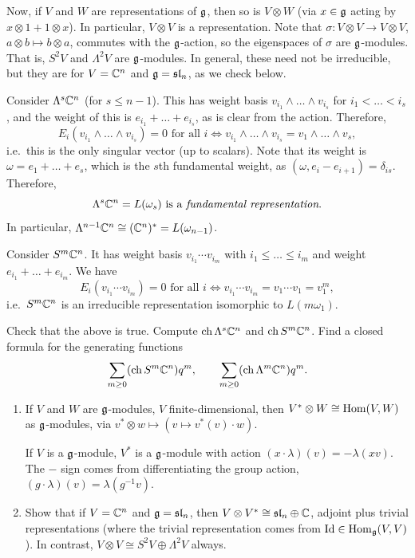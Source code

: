 Now, if $V$ and $W$ are representations of $\mathfrak{g}$, then so is $V \otimes W$ (via
$x \in \mathfrak{g}$ acting by $x \otimes 1 + 1 \otimes x$). In particular,
$V \otimes V$ is a representation. Note that
$\sigma\colon V \otimes V \to V \otimes V$, $a \otimes b \mapsto b \otimes a$,
commutes with the $\mathfrak{g}$-action, so the eigenspaces of $\sigma$ are
$\mathfrak{g}$-modules. That is, $S^2V$ and $\Lambda^2V$ are $\mathfrak{g}$-modules. In general,
these need not be irreducible, but they are for $V = \mathbb{C}^n$ and $\mathfrak{g} = \mathfrak{sl}_n$, as
we check below.

Consider $\Lambda^s\mathbb{C}^n$ (for $s \leq n - 1$). This has weight basis
$v_{i_1} \wedge \dots \wedge v_{i_s}$ for $i_1 < \dots < i_s$, and the weight
of this is $e_{i_1} + \dots + e_{i_s}$, as is clear from the action. Therefore,
\[
  E_i(v_{i_1} \wedge \dots \wedge v_{i_s}) = 0 \text{ for all } i
  \iff v_{i_1} \wedge \dots \wedge v_{i_s} = v_1 \wedge \dots \wedge v_s,
\]
i.e.\ this is the only singular vector (up to scalars). Note that its weight
is $\omega = e_1 + \dots + e_s$, which is the $s$th fundamental weight, as
$(\omega, e_i - e_{i+1}) = \delta_{is}$. Therefore,
\[
  \Lambda^s\mathbb{C}^n = L(\omega_s) \text{ is a \emph{fundamental representation}.}
\]
In particular, $\Lambda^{n-1}\mathbb{C}^n \cong (\mathbb{C}^n)^* = L(\omega_{n-1})$.

Consider $S^m\mathbb{C}^n$. It has weight basis $v_{i_1}\cdots v_{i_m}$ with
$i_1 \leq \dots \leq i_m$ and weight $e_{i_1} + \dots + e_{i_m}$. We have
\[
  E_i(v_{i_1}\cdots v_{i_m}) = 0 \text{ for all } i
  \iff v_{i_1}\cdots v_{i_m} = v_1\cdots v_1 = v_1^m,
\]
i.e.\ $S^m\mathbb{C}^n$ is an irreducible representation isomorphic to
$L(m\omega_1)$.

\begin{exercise}
Check that the above is true. Compute $\operatorname{ch} \Lambda^s\mathbb{C}^n$ and
$\operatorname{ch} S^m\mathbb{C}^n$. Find a closed formula for the generating functions
\[
  \sum_{m \geq 0} (\operatorname{ch} S^m\mathbb{C}^n)q^m, \qquad \sum_{m \geq 0} (\operatorname{ch} \Lambda^m\mathbb{C}^n)q^m.
\]
\end{exercise}


\begin{exercise}\leavevmode
\begin{enumerate}
  \item If $V$ and $W$ are $\mathfrak{g}$-modules, $V$ finite-dimensional, then
    $V^* \otimes W \cong \operatorname{Hom}(V, W)$ as $\mathfrak{g}$-modules, via
    $v^* \otimes w \mapsto (v \mapsto v^*(v) \cdot w)$.

    \begin{remark}
    If $V$ is a $\mathfrak{g}$-module, $V^*$ is a $\mathfrak{g}$-module with action
    $(x \cdot \lambda)(v) = -\lambda(xv)$. The $-$ sign comes from
    differentiating the group action, $(g \cdot \lambda)(v) = \lambda(g^{-1}v)$.
    \end{remark}
  \item Show that if $V = \mathbb{C}^n$ and $\mathfrak{g} = \mathfrak{sl}_n$, then
    $V \otimes V^* \cong \mathfrak{sl}_n \oplus \mathbb{C}$, adjoint plus trivial
    representations (where the trivial representation comes from
    $\operatorname{Id} \in \operatorname{Hom}_{\mathfrak{g}}(V, V)$). In contrast, $V \otimes V \cong S^2V \oplus \Lambda^2V$
    always.
\end{enumerate}
\end{exercise}

